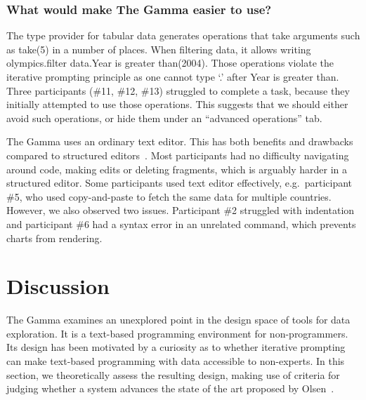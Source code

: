\documentclass[manuscript,review,anonymous]{acmart}
\newcommand{\ikvd}[1]{{\fontfamily{zi4}\selectfont\small #1}}
\begin{document}
\subsubsection*{What would make The Gamma easier to use?}
The type provider for tabular data generates operations that take arguments such as \ikvd{take(5)}
in a number of places. When filtering data, it allows writing
\ikvd{olympics.\textquotesingle filter data\textquotesingle.\textquotesingle Year is greater than\textquotesingle(2004)}.
Those operations violate the iterative prompting principle as one cannot type `.' after
\ikvd{\textquotesingle Year is greater than\textquotesingle}. Three participants (\#11, \#12, \#13)
struggled to complete a task, because they initially attempted to use those operations.
This suggests that we should either avoid such operations, or hide them under an ``advanced operations''
tab.

The Gamma uses an ordinary text editor. This has both benefits
and drawbacks compared to structured editors~\cite{structure-based,livenut,lamdu}.
Most participants had no difficulty navigating around code, making edits or deleting
fragments, which is arguably harder in a structured editor. Some participants used
text editor effectively, e.g.~participant \#5, who used copy-and-paste to fetch the same data
for multiple countries. However, we also observed two issues. Participant \#2 struggled
with indentation and participant \#6 had a syntax error in an unrelated command, which
prevents charts from rendering.



\section{Discussion}
\label{sec:discuss}

The Gamma examines an unexplored point in the design space of tools for data exploration. It is
a text-based programming environment for non-programmers. Its design has been motivated
by a curiosity as to whether iterative prompting can make text-based programming with data
accessible to non-experts. In this section, we theoretically assess the resulting design,
making use of criteria for judging whether a system advances the state of the art proposed by
Olsen~\cite{evaluating}.
\end{document}
